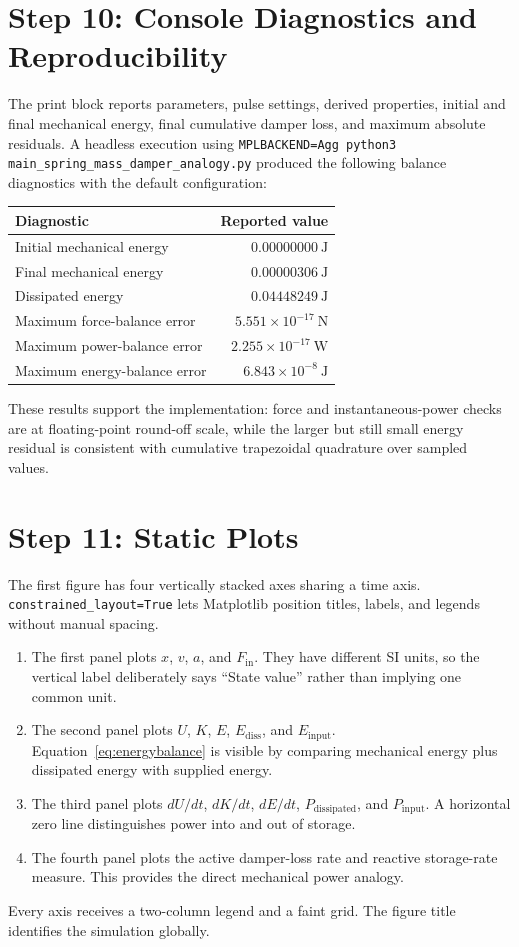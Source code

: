 \documentclass[11pt]{article}
\begin{document}
\section{Step 10: Console Diagnostics and Reproducibility}
The print block reports parameters, pulse settings, derived properties, initial and final mechanical energy, final cumulative damper loss, and maximum absolute residuals. A headless execution using \texttt{MPLBACKEND=Agg python3 main\_spring\_mass\_damper\_analogy.py} produced the following balance diagnostics with the default configuration:
\begin{center}
\begin{tabular}{lr}
\toprule
Diagnostic & Reported value \\
\midrule
Initial mechanical energy & $0.00000000\ \mathrm{J}$ \\
Final mechanical energy & $0.00000306\ \mathrm{J}$ \\
Dissipated energy & $0.04448249\ \mathrm{J}$ \\
Maximum force-balance error & $5.551\times10^{-17}\ \mathrm{N}$ \\
Maximum power-balance error & $2.255\times10^{-17}\ \mathrm{W}$ \\
Maximum energy-balance error & $6.843\times10^{-8}\ \mathrm{J}$ \\
\bottomrule
\end{tabular}
\end{center}
These results support the implementation: force and instantaneous-power checks are at floating-point round-off scale, while the larger but still small energy residual is consistent with cumulative trapezoidal quadrature over sampled values.

\section{Step 11: Static Plots}
The first figure has four vertically stacked axes sharing a time axis. \texttt{constrained\_layout=True} lets Matplotlib position titles, labels, and legends without manual spacing.
\begin{enumerate}
  \item The first panel plots $x$, $v$, $a$, and $F_{\mathrm{in}}$. They have different SI units, so the vertical label deliberately says ``State value'' rather than implying one common unit.
  \item The second panel plots $U$, $K$, $E$, $E_{\mathrm{diss}}$, and $E_{\mathrm{input}}$. Equation~\ref{eq:energybalance} is visible by comparing mechanical energy plus dissipated energy with supplied energy.
  \item The third panel plots $dU/dt$, $dK/dt$, $dE/dt$, $P_{\mathrm{dissipated}}$, and $P_{\mathrm{input}}$. A horizontal zero line distinguishes power into and out of storage.
  \item The fourth panel plots the active damper-loss rate and reactive storage-rate measure. This provides the direct mechanical power analogy.
\end{enumerate}
Every axis receives a two-column legend and a faint grid. The figure title identifies the simulation globally.
\end{document}
